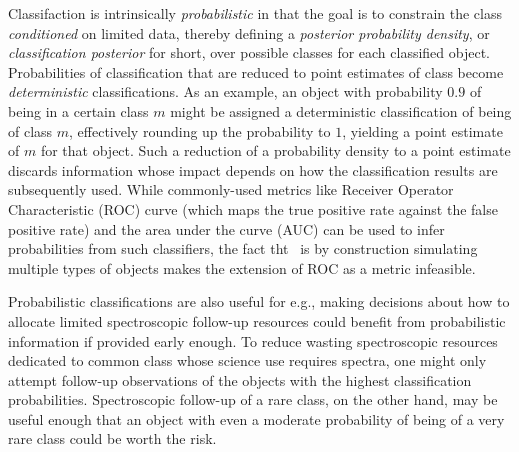 Classifaction is intrinsically \textit{probabilistic} in that the goal is to constrain the class \textit{conditioned} on limited data, thereby defining a \textit{posterior probability density}, or \textit{classification posterior} for short, over possible classes for each classified object.
Probabilities of classification that are reduced to point estimates of class become \textit{deterministic} classifications.
As an example, an object with probability $0.9$ of being in a certain class $m$ might be assigned a deterministic classification of being of class $m$, effectively rounding up the probability to $1$, yielding a point estimate of $m$ for that object.
Such a reduction of a probability density to a point estimate discards information whose impact depends on how the classification results are subsequently used. While commonly-used metrics like Receiver Operator Characteristic (ROC) curve (which maps the true positive rate against the false positive rate) and the area under the curve (AUC) can be used to infer probabilities from such classifiers, the fact tht \plasticc\ is by construction simulating multiple types of objects makes the extension of ROC as a metric infeasible.

Probabilistic classifications are also useful for e.g., making decisions about how to allocate limited spectroscopic follow-up resources could benefit from probabilistic information if provided early enough.
To reduce wasting spectroscopic resources dedicated to common class whose science use requires spectra, one might only attempt follow-up observations of the objects with the highest classification probabilities.
Spectroscopic follow-up of a rare class, on the other hand, may be useful enough that an object with even a moderate probability of being of a very rare class could be worth the risk.

